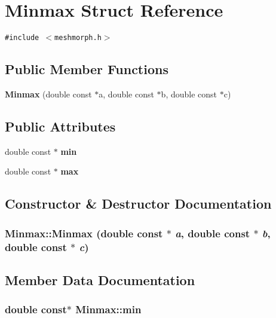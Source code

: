\section{Minmax Struct Reference}
\label{structMinmax}
{\tt \#include $<$meshmorph.h$>$}

\subsection*{Public Member Functions}
\begin{CompactItemize}
\item 
{\bf Minmax} (double const $\ast$a, double const $\ast$b, double const $\ast$c)
\end{CompactItemize}
\subsection*{Public Attributes}
\begin{CompactItemize}
\item 
double const $\ast$ {\bf min}
\item 
double const $\ast$ {\bf max}
\end{CompactItemize}


\subsection{Constructor \& Destructor Documentation}
\subsubsection{\setlength{\rightskip}{0pt plus 5cm}Minmax::Minmax (double const $\ast$ {\em a}, double const $\ast$ {\em b}, double const $\ast$ {\em c})\hspace{0.3cm}{\tt  [inline]}}\label{structMinmax_85cca80dbbf17f2d31fef49d04cee7bf}




\subsection{Member Data Documentation}
\subsubsection{\setlength{\rightskip}{0pt plus 5cm}double const$\ast$ {\bf Minmax::min}}\label{structMinmax_f194061393907d72c64c08faf24af8d3}



